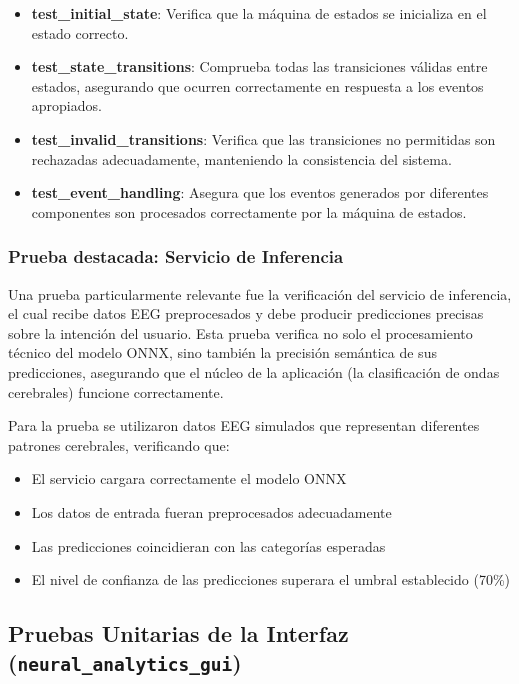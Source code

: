 \begin{table}[ht]
\begin{itemize}
    \item \textbf{test\_initial\_state}: Verifica que la máquina de estados se inicializa en el estado correcto.
    
    \item \textbf{test\_state\_transitions}: Comprueba todas las transiciones válidas entre estados, asegurando que ocurren correctamente en respuesta a los eventos apropiados.
    
    \item \textbf{test\_invalid\_transitions}: Verifica que las transiciones no permitidas son rechazadas adecuadamente, manteniendo la consistencia del sistema.
    
    \item \textbf{test\_event\_handling}: Asegura que los eventos generados por diferentes componentes son procesados correctamente por la máquina de estados.
\end{itemize}
\end{table}

\subsubsection{Prueba destacada: Servicio de Inferencia}

Una prueba particularmente relevante fue la verificación del servicio de inferencia, el cual recibe datos EEG preprocesados y debe producir predicciones precisas sobre la intención del usuario. Esta prueba verifica no solo el procesamiento técnico del modelo ONNX, sino también la precisión semántica de sus predicciones, asegurando que el núcleo de la aplicación (la clasificación de ondas cerebrales) funcione correctamente.

Para la prueba se utilizaron datos EEG simulados que representan diferentes patrones cerebrales, verificando que:
\begin{itemize}
    \item El servicio cargara correctamente el modelo ONNX
    \item Los datos de entrada fueran preprocesados adecuadamente
    \item Las predicciones coincidieran con las categorías esperadas
    \item El nivel de confianza de las predicciones superara el umbral establecido (70\%)
\end{itemize}

\newpage
\subsection{Pruebas Unitarias de la Interfaz (\texttt{neural\_analytics\_gui})}

